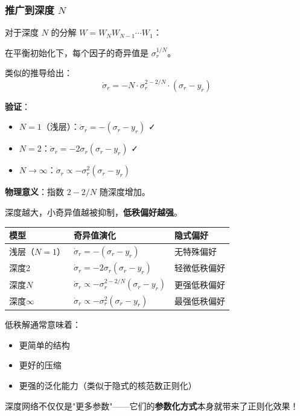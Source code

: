 \documentclass[12pt, a4paper]{ctexart}
\begin{document}
\subsubsection{推广到深度 $N$}

\begin{blackboard}[深度 $N$ 的结果]

对于深度 $N$ 的分解 $W = W_N W_{N-1} \cdots W_1$：

在平衡初始化下，每个因子的奇异值是 $\sigma_r^{1/N}$。

类似的推导给出：
\[
\boxed{\dot{\sigma}_r = -N \cdot \sigma_r^{2-2/N} \cdot (\sigma_r - y_r)}
\]

\textbf{验证}：
\begin{itemize}
    \item $N = 1$（浅层）：$\dot{\sigma}_r = -(\sigma_r - y_r)$ ✓
    \item $N = 2$：$\dot{\sigma}_r = -2\sigma_r(\sigma_r - y_r)$ ✓
    \item $N \to \infty$：$\dot{\sigma}_r \propto -\sigma_r^2(\sigma_r - y_r)$
\end{itemize}

\textbf{物理意义}：指数 $2 - 2/N$ 随深度增加。

深度越大，小奇异值越被抑制，\textbf{低秩偏好越强}。

\end{blackboard}

\begin{keypoint}[隐式正则化的谱系]
\begin{center}
\begin{tabular}{lll}
\toprule
\textbf{模型} & \textbf{奇异值演化} & \textbf{隐式偏好} \\
\midrule
浅层（$N=1$） & $\dot{\sigma}_r = -(\sigma_r - y_r)$ & 无特殊偏好 \\
深度2 & $\dot{\sigma}_r = -2\sigma_r(\sigma_r - y_r)$ & 轻微低秩偏好 \\
深度$N$ & $\dot{\sigma}_r \propto -\sigma_r^{2-2/N}(\sigma_r - y_r)$ & 更强低秩偏好 \\
深度$\infty$ & $\dot{\sigma}_r \propto -\sigma_r^2(\sigma_r - y_r)$ & 最强低秩偏好 \\
\bottomrule
\end{tabular}
\end{center}
\end{keypoint}

\begin{insight}[为什么深度有助于泛化]
低秩解通常意味着：
\begin{itemize}
    \item 更简单的结构
    \item 更好的压缩
    \item 更强的泛化能力（类似于隐式的核范数正则化）
\end{itemize}

深度网络不仅仅是"更多参数"——它们的\textbf{参数化方式}本身就带来了正则化效果！
\end{insight}
\end{document}
